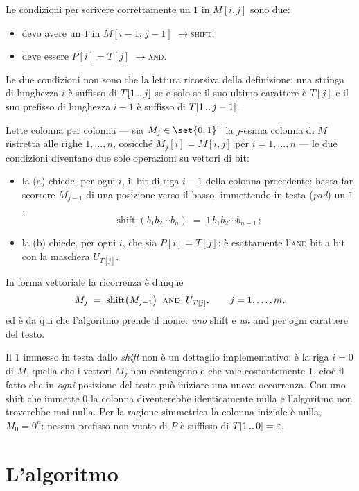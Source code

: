 Le condizioni per scrivere correttamente un $1$ in $M[i,j]$ sono due:
\begin{itemize}
  \item[a)] devo avere un $1$ in $M[i-1,\,j-1]$ \quad$\longrightarrow$\quad \textsc{shift};
  \item[b)] deve essere $P[i]=T[j]$ \quad$\longrightarrow$\quad \textsc{and}.
\end{itemize}
Le due condizioni non sono che la lettura ricorsiva della definizione: una stringa di lunghezza
$i$ è suffisso di $T[1\,..\,j]$ se e solo se il suo ultimo carattere è $T[j]$ e il suo prefisso di
lunghezza $i-1$ è suffisso di $T[1\,..\,j-1]$.

Lette colonna per colonna --- sia $M_j\in\set{0,1}^n$ la $j$-esima colonna di $M$ ristretta alle
righe $1,\dots,n$, cosicché $M_j[i]=M[i,j]$ per $i=1,\dots,n$ --- le due condizioni diventano due
sole operazioni su vettori di bit:
\begin{itemize}
  \item la (a) chiede, per ogni $i$, il bit di riga $i-1$ della colonna precedente: basta far
    scorrere $M_{j-1}$ di una posizione verso il basso, immettendo in testa (\emph{pad}) un $1$,
    \[ \operatorname{shift}(b_1b_2\cdots b_n)\;=\;1\,b_1b_2\cdots b_{n-1}\,; \]
  \item la (b) chiede, per ogni $i$, che sia $P[i]=T[j]$: è esattamente l'\textsc{and} bit a bit
    con la maschera $U_{T[j]}$.
\end{itemize}
In forma vettoriale la ricorrenza è dunque
\[
  M_j\;=\;\operatorname{shift}\bigl(M_{j-1}\bigr)\ \mathbin{\textsc{and}}\ U_{T[j]},
  \qquad j=1,\dots,m ,
\]
ed è da qui che l'algoritmo prende il nome: \emph{uno} shift e \emph{un} and per ogni carattere
del testo.

\begin{osservazione}
Il $1$ immesso in testa dallo \emph{shift} non è un dettaglio implementativo: è la riga $i=0$ di
$M$, quella che i vettori $M_j$ non contengono e che vale costantemente $1$, cioè il fatto che in
\emph{ogni} posizione del testo può iniziare una nuova occorrenza. Con uno shift che immette $0$
la colonna diventerebbe identicamente nulla e l'algoritmo non troverebbe mai nulla. Per la ragione simmetrica la colonna iniziale è nulla, $M_0=0^n$: nessun prefisso non
vuoto di $P$ è suffisso di $T[1\,..\,0]=\varepsilon$.
\end{osservazione}


\section{L'algoritmo}

